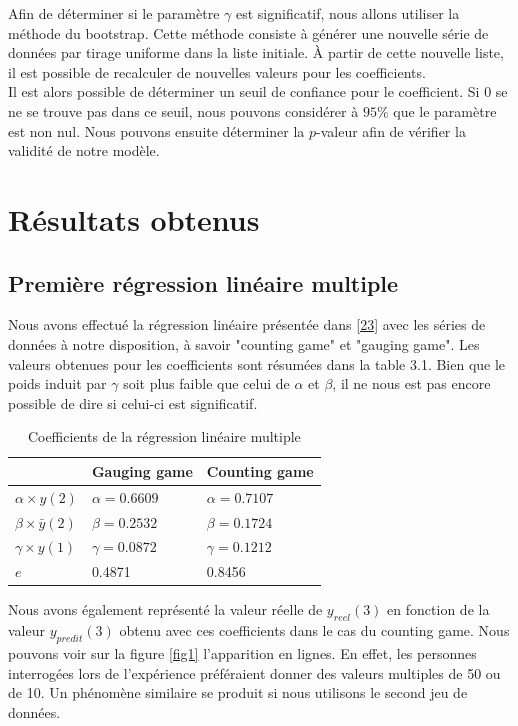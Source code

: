 \documentclass{scrreprt}
\begin{document}
\begin{multicols}{2}
Afin de déterminer si le paramètre $\gamma$ est significatif, nous allons utiliser la méthode du bootstrap. Cette méthode consiste à générer une nouvelle série de données par tirage uniforme dans la liste initiale. À partir de cette nouvelle liste, il est possible de recalculer de nouvelles valeurs pour les coefficients.\\

Il est alors possible de déterminer un seuil de confiance pour le coefficient. Si $0$ se ne se trouve pas dans ce seuil, nous pouvons considérer à $95\%$ que le paramètre est non nul. 
Nous pouvons ensuite déterminer la $p$-valeur afin de vérifier la validité de notre modèle.

\chapter{Résultats obtenus}

\section{Première régression linéaire multiple}

Nous avons effectué la régression linéaire présentée dans \eqref{23} avec les  séries de données à notre disposition, à savoir "counting game" et "gauging game". Les valeurs obtenues pour les coefficients sont résumées dans la table 3.1. Bien que le poids induit par $\gamma$ soit plus faible que celui de $\alpha$ et $\beta$, il ne nous est pas encore possible de dire si celui-ci est significatif. \\

\end{multicols}

\begin{table}
	\begin{tabular}{|p{4cm}|p{4.5cm}|p{4.5cm}|}
		\hline
 & Gauging game & Counting game \tabularnewline
		\hline
$\alpha \times y(2)$ & $\alpha =  0.6609$ & $\alpha = 0.7107$ \tabularnewline
		\hline
$\beta \times \bar{y}(2)$ & $\beta = 0.2532$ & $\beta =0.1724$ \tabularnewline
		\hline
$\gamma \times y(1)$ & $\gamma = 0.0872$  & $\gamma = 0.1212$ \tabularnewline
		\hline
$e$ &  0.4871 & 0.8456 \tabularnewline
		\hline
	\end{tabular}
	\caption{Coefficients de la régression linéaire multiple}
\end{table}

\begin{multicols}{2}

Nous avons également représenté la valeur réelle de $y_{reel}(3)$ en fonction de la valeur $y_{predit}(3)$ obtenu avec ces coefficients dans le cas du counting game. Nous pouvons voir sur la figure \ref{fig1} l'apparition en lignes. En effet, les personnes interrogées lors de l'expérience préféraient donner des valeurs multiples de 50 ou de 10. Un phénomène similaire se produit si nous utilisons le second jeu de données.\\

\end{multicols}
\end{document}
